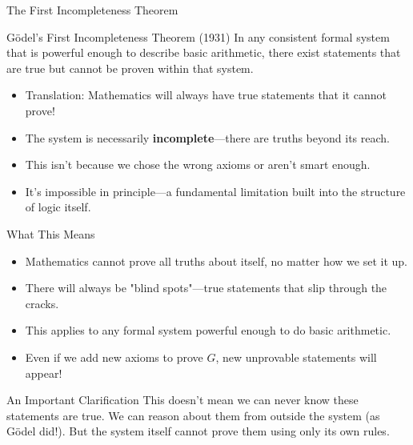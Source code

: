 \documentclass[aspectratio=169]{beamer}
\begin{document}
\begin{frame}{The First Incompleteness Theorem}

\begin{alertblock}{Gödel's First Incompleteness Theorem (1931)}
In any consistent formal system that is powerful enough to describe basic arithmetic, there exist statements that are true but cannot be proven within that system.
\end{alertblock}

\begin{itemize}
    \item Translation: Mathematics will always have true statements that it cannot prove!
    \item The system is necessarily \textbf{incomplete}—there are truths beyond its reach.
    \item This isn't because we chose the wrong axioms or aren't smart enough.
    \item It's impossible in principle—a fundamental limitation built into the structure of logic itself.
\end{itemize}

\end{frame}

\begin{frame}{What This Means}

\begin{itemize}
    \item Mathematics cannot prove all truths about itself, no matter how we set it up.
    \item There will always be "blind spots"—true statements that slip through the cracks.
    \item This applies to any formal system powerful enough to do basic arithmetic.
    \item Even if we add new axioms to prove $G$, new unprovable statements will appear!
\end{itemize}

\begin{block}{An Important Clarification}
This doesn't mean we can never know these statements are true. We can reason about them from outside the system (as Gödel did!). But the system itself cannot prove them using only its own rules.
\end{block}

\end{frame}
\end{document}
